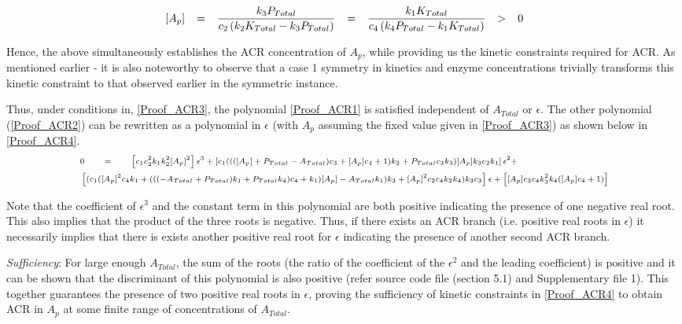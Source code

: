\documentclass[9pt,lineno]{elife}
\begin{document}
\begin{appendixbox}
\begin{equation}
    \scriptsize{
        [A_p] \quad = \quad \frac{k_3P_{Total}}{c_2\left(k_2K_{Total}-k_3P_{Total}\right)} \quad = \quad \frac{k_1K_{Total}}{c_4\left(k_4P_{Total}-k_1K_{Total}\right)} \quad > \quad 0 
    } 
    \label{Proof_ACR3}
\end{equation}

Hence, the above simultaneously establishes the ACR concentration of $A_p$, while providing us the kinetic constraints required for ACR. As mentioned earlier - it is also noteworthy to observe that a case 1 symmetry in kinetics and enzyme concentrations trivially transforms this kinetic constraint to that observed earlier in the symmetric instance. 

Thus, under conditions in, \cref{Proof_ACR3}, the polynomial \cref{Proof_ACR1} is satisfied independent of $A_{Total}$ or $\epsilon$. The other polynomial (\cref{Proof_ACR2}) can be rewritten as a polynomial in $\epsilon$ (with $A_p$ assuming the fixed value given in \cref{Proof_ACR3}) as shown below in \cref{Proof_ACR4}.
\begin{equation}
    \scriptsize{
    \begin{aligned}
        & 0 \qquad = \qquad \left[c_1c_2^2k_1k_2^2[A_p]^2\right] \epsilon^3 + \left[c_1((([A_p] + P_{Total} - A_{Total})c_3 + [A_p]c_4 + 1)k_2 + P_{Total}c_3k_3)[A_p]k_3c_2k_1\right] \epsilon^2 +  \\
        &\left[(c_1([A_p]^2c_4k_1 + (((-A_{Total} + P_{Total})k_1 +
        P_{Total}k_4)c_4 + k_1)[A_p] - A_{Total}k_1)k_3 + [A_p]^2c_2c_4k_2k_4)k_3c_3\right] \epsilon + \left[[A_p]c_3c_4k_3^2k_4([A_p]c_4 + 1) \right]
    \end{aligned}
    }
    \label{Proof_ACR4}
\end{equation}

Note that the coefficient of $\epsilon^3$ and the constant term in this polynomial are both positive indicating the presence of one negative real root. This also implies that the product of the three roots is negative. Thus, if there exists an ACR branch (i.e. positive real roots in $\epsilon$) it necessarily implies that there is exists another positive real root for $\epsilon$ indicating the presence of another second ACR branch. 


\textit{Sufficiency}: For large enough $A_{Total}$, the sum of the roots (the ratio of the coefficient of the $\epsilon^2$ and the leading coefficient) is positive and it can be shown that the discriminant of this polynomial is also positive (refer source code file (section 5.1) and Supplementary file 1). This together guarantees the presence of two positive real roots in $\epsilon$, proving the sufficiency of kinetic constraints in \cref{Proof_ACR4} to obtain ACR in $A_p$ at some finite range of concentrations of $A_{Total}$.


\end{appendixbox}
\end{document}
